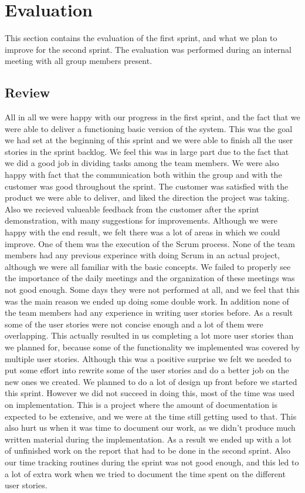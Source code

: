 \section{Evaluation}
This section contains the evaluation of the first sprint, and what we plan to improve for the second sprint. The evaluation was performed during an internal meeting with all group members present.

\subsection{Review}
All in all we were happy with our progress in the first sprint, and the fact that we were able to deliver a functioning basic version of the system. This was the goal we had set at the beginning of this sprint and we were able to finish all the user stories in the sprint backlog. We feel this was in large part due to the fact that we did a good job in dividing tasks among the team members. We were also happy with fact that the communication both within the group and with the customer was good throughout the sprint. The customer was satisfied with the product we were able to deliver, and liked the direction the project was taking. Also we recieved valueable feedback from the customer after the sprint demonstration, with many suggestions for improvements.
\newline
\newline
Although we were happy with the end result, we felt there was a lot of areas in which we could improve. One of them was the execution of the Scrum process. None of the team members had any previous experince with doing Scrum in an actual project, although we were all familiar with the basic concepts. We failed to properly see the importance of the daily meetings and the organization of these meetings was not good enough. Some days they were not performed at all, and we feel that this was the main reason we ended up doing some double work. In addition none of the team members had any experience in writing user stories before. As a result some of the user stories were not concise enough and a lot of them were overlapping. This actually resulted in us completing a lot more user stories than we planned for, because some of the functionality we implemented was covered by multiple user stories. Although this was a positive surprise we felt we needed to put some effort into rewrite some of the user stories and do a better job on the new ones we created.
\newline
\newline
We planned to do a lot of design up front before we started this sprint. However we did not succeed in doing this, most of the time was used on implementation. This is a project where the amount of documentation is expected to be extensive, and we were at the time still getting used to that. This also hurt us when it was time to document our work, as we didn't produce much written material during the implementation. As a result we ended up with a lot of unfinished work on the report that had to be done in the second sprint. Also our time tracking routines during the sprint was not good enough, and this led to a lot of extra work when we tried to document the time spent on the different user stories.

